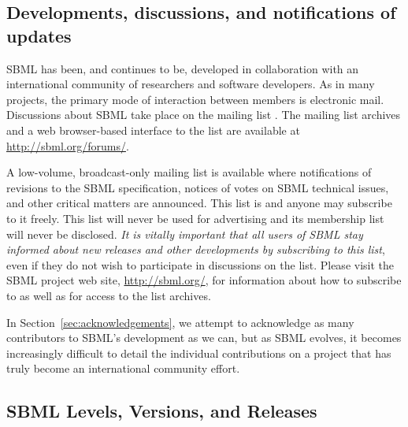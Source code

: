 \subsection{Developments, discussions, and notifications of updates}


SBML has been, and continues to be, developed in collaboration
with an international community of researchers and software
developers.  As in many projects, the primary mode of interaction
between members is electronic mail.  Discussions about SBML take
place on the mailing list
.  The
mailing list archives and a web browser-based interface to the
list are available at \url{http://sbml.org/forums/}.

A low-volume, broadcast-only mailing list is available 
where notifications of
revisions to the SBML speci\-fication, notices of votes on SBML
technical issues, and other critical matters are announced.  This
list is 
and anyone may subscribe to it freely.  This list will never be
used for advertising and its membership list will never be
disclosed.  \emph{It is vitally important that all users of SBML
  stay informed about new releases and other developments by
  subscribing to this list}, even if they do not wish to
participate in discussions on the
 list.
Please visit the SBML project web site, \url{http://sbml.org/},
for information about how to subscribe to
 as well
as for access to the list archives.

In Section~\ref{sec:acknowledgements}, we attempt to acknowledge
as many contributors to SBML's development as we can, but as SBML
evolves, it becomes increasingly difficult to detail the
individual contributions on a project that has truly become an
international community effort.


\subsection{SBML Levels, Versions, and Releases}
\label{sec:levels-versions-releases}

